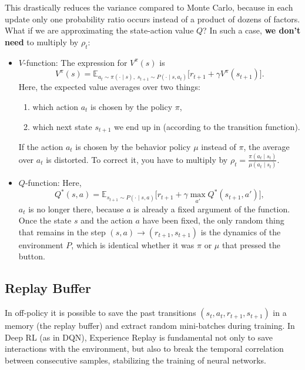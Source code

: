 \documentclass[10pt, a4paper]{report}
\begin{document}
This drastically reduces the variance compared to Monte Carlo, because in each update only one probability ratio occurs instead of a product of dozens of factors. What if we are approximating the state-action value $Q$? In such a case, \textbf{we don't need} to multiply by $\rho_t$:\begin{itemize}
    \item $V$-function: The expression for $V^\pi(s)$ is\begin{equation}
        V^\pi(s) = \mathbb{E}_{a_t \sim \pi(\cdot \mid s),\; s_{t+1} \sim P(\cdot \mid s, a_t)} \Big[ r_{t+1} + \gamma V^\pi(s_{t+1}) \Big].
    \end{equation}
    Here, the expected value averages over two things:\begin{enumerate}
        \item which action $a_t$ is chosen by the policy $\pi$,
        \item which next state $s_{t+1}$ we end up in (according to the transition function).
    \end{enumerate}
    If the action $a_t$ is chosen by the behavior policy $\mu$ instead of $\pi$, the average over $a_t$ is distorted. To correct it, you have to multiply by $\rho_t = \frac{\pi(a_t \mid s_t)}{\mu(a_t \mid s_t)}$.
    \item $Q$-function: Here,\begin{equation}
        Q^*(s, a) = \mathbb{E}_{s_{t+1} \sim P(\cdot \mid s, a)} \Big[ r_{t+1} + \gamma \max_{a'} Q^*(s_{t+1}, a') \Big],
    \end{equation}
    $a_t$ is no longer there, because $a$ is already a fixed argument of the function. Once the state $s$ and the action $a$ have been fixed, the only random thing that remains in the step $(s, a) \to (r_{t+1}, s_{t+1})$ is the dynamics of the environment $P$, which is identical whether it was $\pi$ or $\mu$ that pressed the button.
\end{itemize}
\subsection{Replay Buffer}
In off-policy it is possible to save the past transitions $(s_t, a_t, r_{t+1}, s_{t+1})$ in a memory (the replay buffer) and extract random mini-batches during training. In Deep RL (as in DQN), Experience Replay is fundamental not only to save interactions with the environment, but also to break the temporal correlation between consecutive samples, stabilizing the training of neural networks.
\end{document}
